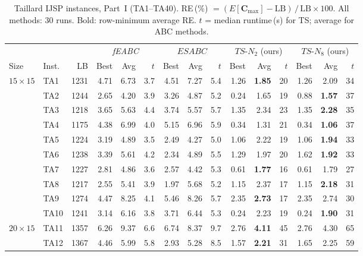 \documentclass[a4paper,11pt]{article}
\begin{document}
\begin{table}[htbp]
\centering\small\setlength{\tabcolsep}{3pt}
\caption{Taillard IJSP instances, Part~I (TA1--TA40).
RE\,(\%) $= (E[\mathbf{C}_{\max}]-\mathrm{LB})\,/\,\mathrm{LB}\times100$.
All methods: 30 runs. Bold: row-minimum average RE.
$t$ = median runtime\,(s) for TS; average for ABC methods.}
\label{tab:supp_taillard_i}
\begin{tabular}{ll r | rr r | rr r | rr r | rr r}
\hline
 & & & \multicolumn{3}{c|}{\emph{fEABC} \cite{DiazFEABC2023}} &
         \multicolumn{3}{c|}{$ESABC$ \cite{DiazICAE2023}} &
         \multicolumn{3}{c|}{$TS$-$N_2$ (ours)} &
         \multicolumn{3}{c}{$TS$-$N_8$ (ours)} \\
Size & Inst. & LB & Best & Avg & $t$ & Best & Avg & $t$ & Best & Avg & $t$ & Best & Avg & $t$ \\
\hline
$15\times15$ & TA1 & 1231 & 4.71 & 6.73 & 3.7 & 4.51 & 7.27 & 5.4 & 1.26 & \textbf{1.85} & 20 & 1.26 & 2.09 & 34 \\
 & TA2 & 1244 & 2.65 & 4.20 & 3.9 & 3.26 & 4.87 & 5.2 & 0.24 & 1.65 & 19 & 0.88 & \textbf{1.57} & 37 \\
 & TA3 & 1218 & 3.65 & 5.63 & 4.4 & 3.74 & 5.57 & 5.7 & 1.35 & 2.34 & 23 & 1.35 & \textbf{2.28} & 35 \\
 & TA4 & 1175 & 4.38 & 6.99 & 4.0 & 5.15 & 6.96 & 5.9 & 0.34 & 1.31 & 21 & 0.34 & \textbf{1.06} & 37 \\
 & TA5 & 1224 & 3.19 & 4.89 & 3.5 & 2.49 & 4.27 & 5.0 & 1.06 & 2.22 & 19 & 1.06 & \textbf{1.94} & 33 \\
 & TA6 & 1238 & 3.39 & 5.61 & 4.2 & 2.34 & 4.89 & 5.5 & 1.29 & 1.97 & 20 & 1.62 & \textbf{1.92} & 33 \\
 & TA7 & 1227 & 2.81 & 4.86 & 3.6 & 2.57 & 4.42 & 5.3 & 0.61 & \textbf{1.77} & 16 & 0.61 & 1.79 & 27 \\
 & TA8 & 1217 & 2.55 & 5.41 & 3.9 & 1.97 & 5.68 & 5.2 & 1.15 & 2.37 & 17 & 1.15 & \textbf{2.18} & 31 \\
 & TA9 & 1274 & 4.47 & 8.25 & 4.1 & 5.46 & 8.26 & 5.7 & 2.35 & \textbf{2.73} & 17 & 2.35 & 2.74 & 30 \\
 & TA10 & 1241 & 3.14 & 6.16 & 3.8 & 3.71 & 6.44 & 5.3 & 0.24 & 2.23 & 19 & 0.24 & \textbf{1.90} & 31 \\
\hline
$20\times15$ & TA11 & 1357 & 6.26 & 9.37 & 6.6 & 6.74 & 8.37 & 9.7 & 2.76 & \textbf{4.11} & 45 & 2.76 & 4.30 & 65 \\
 & TA12 & 1367 & 4.46 & 5.99 & 5.8 & 2.93 & 5.28 & 8.5 & 1.57 & \textbf{2.21} & 31 & 1.65 & 2.25 & 59 \\

\end{tabular}
\end{table}
\end{document}
